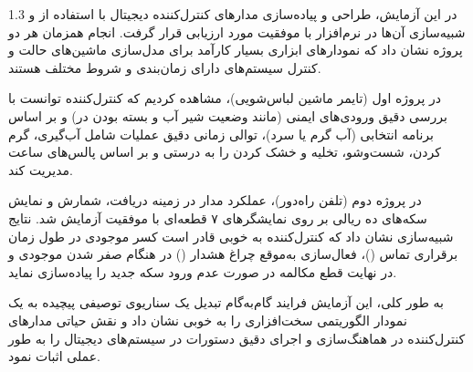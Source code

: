 \documentclass[a4paper,12pt]{article}
\numberwithin{figure}{subsection}
\begin{document}
\begin{spacing}{1.3}
در این آزمایش، طراحی و پیاده‌سازی مدارهای کنترل‌کننده دیجیتال با استفاده از  و شبیه‌سازی آن‌ها در نرم‌افزار  با موفقیت مورد ارزیابی قرار گرفت. انجام همزمان هر دو پروژه نشان داد که نمودارهای  ابزاری بسیار کارآمد برای مدل‌سازی ماشین‌های حالت و کنترل سیستم‌های دارای زمان‌بندی و شروط مختلف هستند.

در پروژه اول (تایمر ماشین لباس‌شویی)، مشاهده کردیم که کنترل‌کننده توانست با بررسی دقیق ورودی‌های ایمنی (مانند وضعیت شیر آب و بسته بودن در) و بر اساس برنامه انتخابی (آب گرم یا سرد)، توالی زمانی دقیق عملیات شامل آب‌گیری، گرم کردن، شست‌وشو، تخلیه و خشک کردن را به درستی و بر اساس پالس‌های ساعت مدیریت کند. 

در پروژه دوم (تلفن راه‌دور)، عملکرد مدار در زمینه دریافت، شمارش و نمایش سکه‌های ده ریالی بر روی نمایشگرهای ۷ قطعه‌ای با موفقیت آزمایش شد. نتایج شبیه‌سازی نشان داد که کنترل‌کننده به خوبی قادر است کسر موجودی در طول زمان برقراری تماس ()، فعال‌سازی به‌موقع چراغ هشدار () در هنگام صفر شدن موجودی و در نهایت قطع مکالمه در صورت عدم ورود سکه جدید را پیاده‌سازی نماید.

به طور کلی، این آزمایش فرایند گام‌به‌گام تبدیل یک سناریوی توصیفی پیچیده به یک نمودار الگوریتمی سخت‌افزاری را به خوبی نشان داد و نقش حیاتی مدارهای کنترل‌کننده در هماهنگ‌سازی و اجرای دقیق دستورات در سیستم‌های دیجیتال را به طور عملی اثبات نمود.

\end{spacing}
\end{document}
